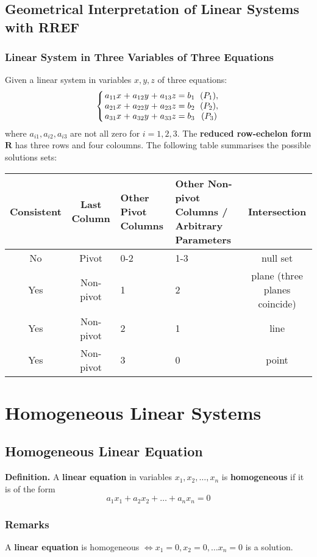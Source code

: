 \documentclass[../ma2001_notes.tex]{subfiles}
\begin{document}
\subsection{Geometrical Interpretation of Linear Systems with RREF}
\subsubsection{Linear System in Three Variables of Three Equations}
Given a linear system in variables \(x, y, z\) of three equations:
\[\left\{
\arraycolsep=1.4pt
\begin{array}{cccccccc}
	a_{11}x & + & a_{12}y & + & a_{13}z & = & b_1 & \ (P_1), \\
	a_{21}x & + & a_{22}y & + & a_{23}z & = & b_2 & \ (P_2), \\
	a_{31}x & + & a_{32}y & + & a_{33}z & = & b_3 & \ (P_3)
\end{array}\right.\]
where \(a_{i1}, a_{i2}, a_{i3}\) are not all zero for \(i=1,2,3\). The \textbf{reduced row-echelon form} \(\bm{R}\) has three rows and four coloumns. The following table summarises the possible solutions sets:
\begin{center}
\begin{tabular}{|c|c|p{2.5cm}|p{3cm}|c|}
\hline
\textbf{Consistent} & \textbf{Last Column} & \textbf{Other Pivot Columns} & \textbf{Other Non-pivot Columns / Arbitrary Parameters} & \textbf{Intersection} \\
\hline
No & Pivot & 0-2 & 1-3 & null set \\
\hline
Yes & Non-pivot & 1 & 2 & plane (three planes coincide) \\
\hline
Yes & Non-pivot & 2 & 1 & line \\
\hline
Yes & Non-pivot & 3 & 0 & point \\
\hline
\end{tabular}
\end{center}

\section{Homogeneous Linear Systems}
\subsection{Homogeneous Linear Equation}
\textbf{Definition.} A \textbf{linear equation} in variables \(x_1,x_2,\ldots,x_n\) is \textbf{homogeneous} if it is of the form
\[a_1x_1+a_2x_2+\ldots+a_nx_n=0\]

\subsubsection{Remarks}
A \textbf{linear equation} is homogeneous \(\iff x_1=0,x_2=0,\ldots x_n=0\) is a solution.
\end{document}
